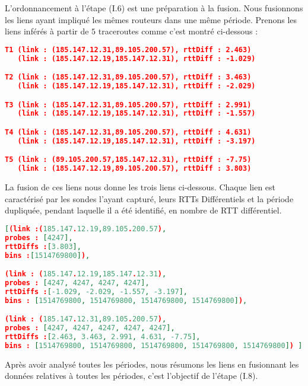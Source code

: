 L'ordonnancement à l'étape  (I.6) est une préparation à la fusion. Nous fusionnons les liens ayant impliqué les mêmes routeurs dans une même période. Prenons les liens inférés à partir de $5$ traceroutes  comme c'est montré ci-dessous :

\begin{lstlisting}[language=json,firstnumber=1, caption={Liste des liens possibles inférés via  les traceroutes T1, T2, T3, T4 et T5}, basicstyle = \footnotesize]
T1 (link : (185.147.12.31,89.105.200.57), rttDiff : 2.463)
   (link : (185.147.12.19,185.147.12.31), rttDiff : -1.029)

T2 (link : (185.147.12.31,89.105.200.57), rttDiff : 3.463) 
   (link : (185.147.12.19,185.147.12.31), rttDiff : -2.029)

T3 (link : (185.147.12.31,89.105.200.57), rttDiff : 2.991) 
   (link : (185.147.12.19,185.147.12.31), rttDiff : -1.557)

T4 (link : (185.147.12.31,89.105.200.57), rttDiff : 4.631) 
   (link : (185.147.12.19,185.147.12.31), rttDiff : -3.197)

T5 (link : (89.105.200.57,185.147.12.31), rttDiff : -7.75) 
   (link : (185.147.12.19,89.105.200.57), rttDiff : 3.803)
\end{lstlisting}

La fusion de ces liens nous donne les trois liens ci-dessous. Chaque lien est caractérisé par les sondes l'ayant capturé, leurs  RTTs Différentiels et la période dupliquée, pendant laquelle il a été identifié, en nombre de RTT différentiel. 

\begin{lstlisting}[language=json,firstnumber=1, caption={Caractérisation des liens identifiés lors  de la période 1514769800 avec les traceroutes T1, T2, T3, T4 et T5}, basicstyle = \footnotesize, ]
[(link :(185.147.12.19,89.105.200.57),
probes : [4247],
rttDiffs :[3.803],
bins :[1514769800]),

(link : (185.147.12.19,185.147.12.31),
probes : [4247, 4247, 4247, 4247],
rttDiffs :[-1.029, -2.029, -1.557, -3.197],
bins : [1514769800, 1514769800, 1514769800, 1514769800]),

(link : (185.147.12.31,89.105.200.57),
probes : [4247, 4247, 4247, 4247, 4247],
rttDiffs :[2.463, 3.463, 2.991, 4.631, -7.75],
bins : [1514769800, 1514769800, 1514769800, 1514769800, 1514769800]) ]
\end{lstlisting}

Après avoir analysé  toutes les périodes, nous résumons les liens en fusionnant les données relatives à toutes les périodes, c'est l'objectif de l'étape (I.8).

